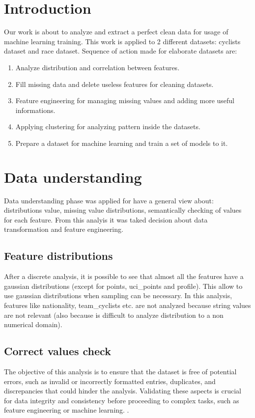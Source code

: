 \documentclass[a4paper, twoside]{article}
\begin{document}


\section{Introduction}
Our work is about to analyze and extract a perfect clean data for usage of machine learning training. This work is applied to 2 different datasets: cyclists dataset and race dataset. Sequence of action made for elaborate datasets are:

\begin{enumerate}[noitemsep]
    \item Analyze distribution and correlation between features.
    \item Fill missing data and delete useless features for cleaning datasets.
    \item Feature engineering for managing missing values and adding more useful informations.
    \item Applying clustering for analyzing pattern inside the datasets.
    \item Prepare a dataset for machine learning and train a set of models to it.
\end{enumerate}

\section{Data understanding}

Data understanding phase was applied for have a general view about: distributions value, missing value distributions, semantically checking of values for each feature. From this analyis it was taked decision about data transformation and feature engineering.

\subsection{Feature distributions}

After a discrete analysis, it is possible to see that almost all the features have a gaussian distributions (except for points, uci\_points and profile). This allow to use gaussian distributions when sampling can be necessary. In this analysis, features like nationality, team\_cyclists etc. are not analyzed because string values are not relevant (also because is difficult to analyze distribution to a non numerical domain).

\subsection{Correct values check}
The objective of this analysis is to ensure that the dataset is free of potential errors, such as invalid or incorrectly formatted entries, duplicates, and discrepancies that could hinder the analysis. Validating these aspects is crucial for data integrity and consistency before proceeding to complex tasks, such as feature engineering or machine learning.
.
\end{document}
